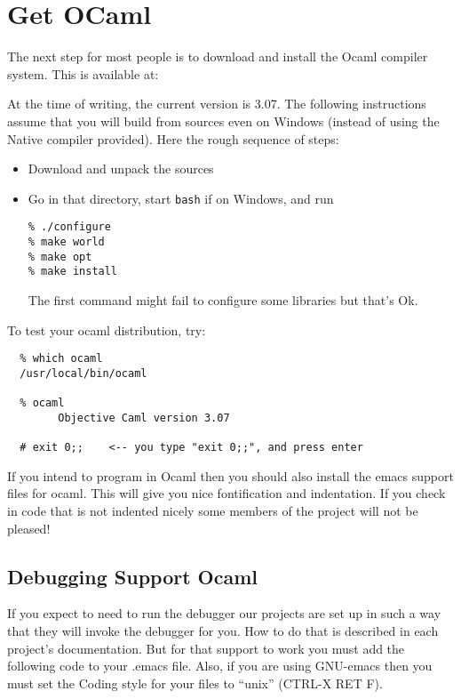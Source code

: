 \documentclass{article}
\def\t#1{{\tt #1}}
\begin{document}
\section{Get OCaml}\label{sec-ocaml}

The next step for most people is to download and install the Ocaml
compiler system.  This is available at:


At the time of writing, the current version is 3.07. The following
instructions assume that you will build from sources even on Windows (instead
of using the Native compiler provided). Here the rough sequence of steps:
\begin{itemize}
\item Download and unpack the sources
\item Go in that directory, start \t{bash} if on Windows, and run
\begin{verbatim}
% ./configure
% make world
% make opt
% make install
\end{verbatim}

 The first command might fail to configure some libraries but that's Ok. 
\end{itemize}

To test your ocaml distribution, try:

\begin{verbatim}
  % which ocaml
  /usr/local/bin/ocaml

  % ocaml
        Objective Caml version 3.07

  # exit 0;;    <-- you type "exit 0;;", and press enter
\end{verbatim}

 If you intend to program in Ocaml then you should also install the emacs
support files for ocaml. This will give you nice fontification and
indentation. If you check in code that is not indented nicely some members of
the project will not be pleased!

 \subsection{Debugging Support Ocaml}

 If you expect to need to run the debugger our projects are set up in such a
way that they will invoke the debugger for you. How to do that is described in
each project's documentation. But for that support to work you must add the
following code to your .emacs file. Also, if you are using GNU-emacs then you
must set the Coding style for your files to ``unix'' (CTRL-X RET F).
\end{document}
